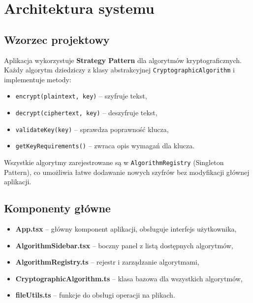 \documentclass[12pt,a4paper]{article}
\begin{document}
\newpage

\section{Architektura systemu}

\subsection{Wzorzec projektowy}
Aplikacja wykorzystuje \textbf{Strategy Pattern} dla algorytmów kryptograficznych. 
Każdy algorytm dziedziczy z klasy abstrakcyjnej \texttt{CryptographicAlgorithm} i implementuje metody:
\begin{itemize}
    \item \texttt{encrypt(plaintext, key)} -- szyfruje tekst,
    \item \texttt{decrypt(ciphertext, key)} -- deszyfruje tekst,
    \item \texttt{validateKey(key)} -- sprawdza poprawność klucza,
    \item \texttt{getKeyRequirements()} -- zwraca opis wymagań dla klucza.
\end{itemize}

Wszystkie algorytmy zarejestrowane są w \texttt{AlgorithmRegistry} (Singleton Pattern), 
co umożliwia łatwe dodawanie nowych szyfrów bez modyfikacji głównej aplikacji.

\subsection{Komponenty główne}
\begin{itemize}
    \item \textbf{App.tsx} -- główny komponent aplikacji, obsługuje interfejs użytkownika,
    \item \textbf{AlgorithmSidebar.tsx} -- boczny panel z listą dostępnych algorytmów,
    \item \textbf{AlgorithmRegistry.ts} -- rejestr i zarządzanie algorytmami,
    \item \textbf{CryptographicAlgorithm.ts} -- klasa bazowa dla wszystkich algorytmów,
    \item \textbf{fileUtils.ts} -- funkcje do obsługi operacji na plikach.
\end{itemize}
\end{document}
